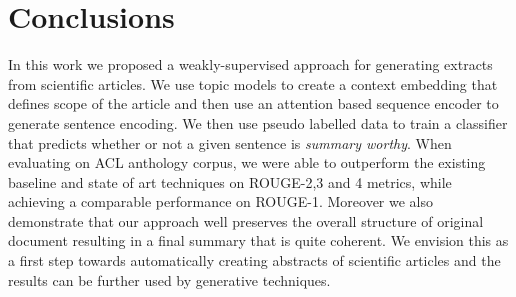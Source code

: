 \section{Conclusions}

In this work we proposed a weakly-supervised approach for generating extracts from scientific articles. We use topic models to create a context embedding that defines scope of the article and then use an attention based sequence encoder to generate sentence encoding. We then use pseudo labelled data to train a classifier that predicts whether or not a given sentence is \emph{summary worthy}. When evaluating on ACL anthology corpus, we were able to outperform the existing baseline and state of art techniques on ROUGE-2,3 and 4 metrics, while achieving a comparable performance on ROUGE-1. Moreover we also demonstrate that our approach well preserves the overall structure of original document resulting in a final summary that is quite coherent. We envision this as a first step towards automatically creating abstracts of scientific articles and the results can be further used by generative techniques.


